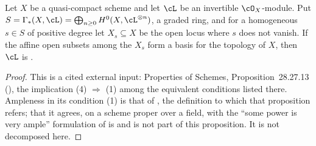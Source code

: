 \begin{lemma}
\label{lem:pc-ample-basis-criterion}
Let $X$ be a quasi-compact scheme and let $\cL$ be an invertible
$\cO_X$-module.  Put
$S=\Gamma_*(X,\cL)=\bigoplus_{n\ge0}H^0(X,\cL^{\otimes n})$, a graded
ring, and for a homogeneous $s\in S$ of positive degree let
$X_s\subseteq X$ be the open locus where $s$ does not vanish.  If the
affine open subsets among the $X_s$ form a basis for the topology of
$X$, then $\cL$ is .
\end{lemma}
\begin{proof}
This is a cited external input: Properties of Schemes,
Proposition~28.27.13 (), the implication
(4) $\Rightarrow$ (1) among the equivalent conditions listed there.
Ampleness in its condition (1) is that of , the
definition to which that proposition refers; that it agrees, on a
scheme proper over a field, with the
``some power is very ample'' formulation of  is
 and is not part of this
proposition.  It is not decomposed here.
%

\end{proof}
